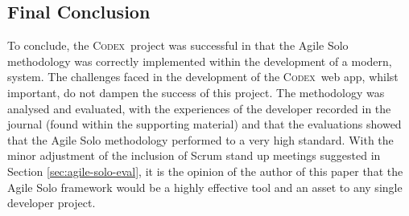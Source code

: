 \documentclass[final]{cmpreport}
\newcommand{\Codex}{\textsc{Codex}}
\begin{document}
		\subsection{Final Conclusion} \label{sec:final-conc}
		To conclude, the \Codex \ project was successful in that the Agile Solo methodology was correctly implemented within the development of a modern, system. The challenges faced in the development of the \Codex \ web app, whilst important, do not dampen the success of this project. The methodology was analysed and evaluated, with the experiences of the developer recorded in the journal (found within the supporting material) and that the evaluations showed that the Agile Solo methodology performed to a very high standard. With the minor adjustment of the inclusion of Scrum stand up meetings suggested in Section \ref{sec:agile-solo-eval}, it is the opinion of the author of this paper that the Agile Solo framework would be a highly effective tool and an asset to any single developer project. 
		
	
	\clearpage	
	
\end{document}
